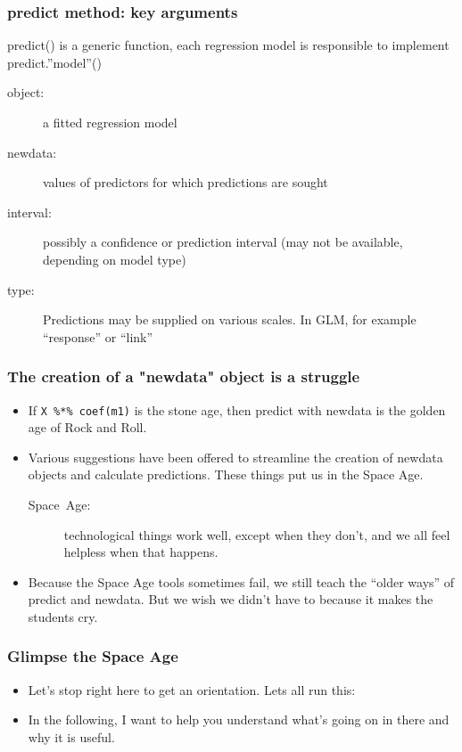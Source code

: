 \documentclass[10pt,english]{beamer}
\begin{document}
\begin{frame}
\frametitle{predict method: key arguments}

predict() is a generic function, each regression model is responsible
to implement predict.''model''()
\begin{description}
\item [{object:}] a fitted regression model
\item [{newdata:}] values of predictors for which predictions are sought
\item [{interval:}] possibly a confidence or prediction interval (may not
be available, depending on model type)
\item [{type:}] Predictions may be supplied on various scales. In GLM,
for example ``response'' or ``link''
\end{description}
\end{frame}

\begin{frame}
\frametitle{The creation of a "newdata" object is a struggle}
\begin{itemize}
\item If \texttt{X \%*\% coef(m1)} is the stone age, then predict with
newdata is the golden age of Rock and Roll. 
\item Various suggestions have been offered to streamline the creation of
newdata objects and calculate predictions. These things put us in
the Space Age.

\begin{description}
\item [{Space~Age:}] technological things work well, except when they
don't, and we all feel helpless when that happens.
\end{description}
\item Because the Space Age tools sometimes fail, we still teach the ``older
ways'' of predict and newdata. But we wish we didn't have to because
it makes the students cry.
\end{itemize}
\end{frame}

\begin{frame}
\frametitle{Glimpse the Space Age}
\begin{itemize}
\item Let's stop right here to get an orientation. Lets all run this:




\item In the following, I want to help you understand what's going on in
there and why it is useful.
\end{itemize}
\end{frame}
\end{document}

